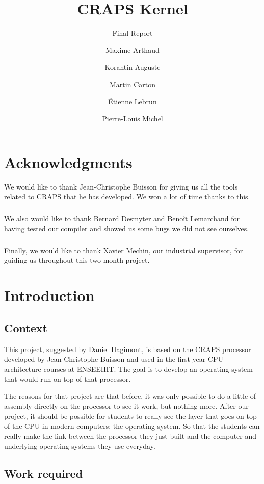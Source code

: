 \documentclass[openany]{book}
\title{CRAPS Kernel}
\subtitle{Final Report}
\author{
       Maxime Arthaud
  \and Korantin Auguste
  \and Martin Carton
  \and Étienne Lebrun
  \and Pierre-Louis Michel
}
\begin{document}
  

  \chapter*{Acknowledgments}
    We would like to thank Jean-Christophe Buisson for giving us all the tools
    related to CRAPS that he has developed. We won a lot of time thanks to this.

    \paragraph{}
    We also would like to thank Bernard Desmyter and Benoît Lemarchand for
    having tested our compiler and showed us some bugs we did not see ourselves.

    \paragraph{}
    Finally, we would like to thank Xavier Mechin, our industrial supervisor,
    for guiding us throughout this two-month project.

  \tableofcontents

  \chapter{Introduction}
    \section{Context}
      This project, suggested by Daniel Hagimont, is based on the CRAPS
      processor developed by Jean-Christophe Buisson and used in the first-year
      CPU architecture courses at ENSEEIHT. The goal is to develop an operating
      system that would run on top of that processor.

      The reasons for that project are that before, it was only possible to do a
      little of assembly directly on the processor to see it work, but nothing
      more.  After our project, it should be possible for students to really see
      the layer that goes on top of the CPU in modern computers: the operating
      system. So that the students can really make the link between the
      processor they just built and the computer and underlying operating
      systems they use everyday.

    \section{Work required}
\end{document}

